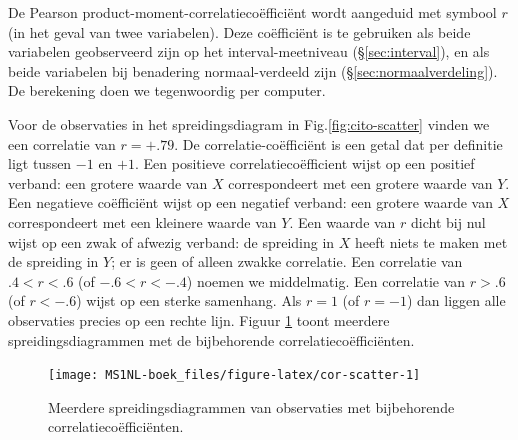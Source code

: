 \documentclass[
]{book}
\begin{document}
De Pearson product-moment-correlatiecoëfficiënt wordt aangeduid met
symbool \(r\) (in het geval van twee variabelen). Deze coëfficiënt is te
gebruiken als beide variabelen geobserveerd zijn op het
interval-meetniveau
(§\ref{sec:interval}), en als beide variabelen bij benadering
normaal-verdeeld zijn
(§\ref{sec:normaalverdeling}). De berekening doen we tegenwoordig
per computer.

Voor de observaties in het spreidingsdiagram in
Fig.\ref{fig:cito-scatter} vinden we een correlatie van \(r=+.79\). De
correlatie-coëfficiënt is een getal dat per definitie ligt tussen \(-1\)
en \(+1\). Een positieve correlatiecoëfficient wijst op een positief
verband: een grotere waarde van \(X\) correspondeert met een grotere
waarde van \(Y\). Een negatieve coëfficiënt wijst op een negatief verband:
een grotere waarde van \(X\) correspondeert met een kleinere waarde van
\(Y\). Een waarde van \(r\) dicht bij nul wijst op een zwak of afwezig
verband: de spreiding in \(X\) heeft niets te maken met de spreiding in
\(Y\); er is geen of alleen zwakke correlatie. Een correlatie van
\(.4<r<.6\) (of \(-.6 < r < -.4\)) noemen we middelmatig. Een correlatie van
\(r>.6\) (of \(r< -.6\)) wijst op een sterke samenhang. Als \(r=1\) (of
\(r=-1\)) dan liggen alle observaties precies op een rechte lijn.
Figuur \ref{fig:cor-scatter} toont meerdere spreidingsdiagrammen met de
bijbehorende correlatiecoëfficiënten.

\begin{figure}

{\centering \texttt{[image: MS1NL-boek\_files/figure-latex/cor-scatter-1]} 

}

\caption{Meerdere spreidingsdiagrammen van observaties met bijbehorende correlatiecoëfficiënten.}\label{fig:cor-scatter}
\end{figure}
\end{document}
